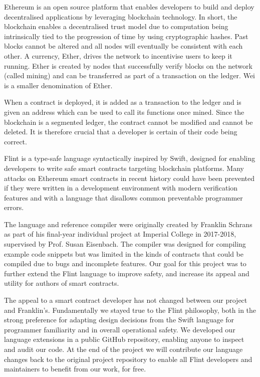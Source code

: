 Ethereum is an open source platform that enables developers to build and deploy decentralised applications by leveraging blockchain technology\cite{bg-ethereum}. In short, the blockchain enables a decentralised trust model due to computation being intrinsically tied to the progression of time by using cryptographic hashes\cite{ptb}. Past blocks cannot be altered and all nodes will eventually be consistent with each other. A currency, Ether, drives the network to incentivise users to keep it running. Ether is created by nodes that successfully verify blocks on the network (called mining) and can be transferred as part of a transaction on the ledger. Wei is a smaller denomination of Ether.

When a contract is deployed, it is added as a transaction to the ledger and is given an address which can be used to call its functions once mined\cite{md-mp}. Since the blockchain is a segmented ledger, the contract cannot be modified and cannot be deleted. It is therefore crucial that a developer is certain of their code being correct\cite{yp}.

Flint is a type-safe language syntactically inspired by Swift, designed for enabling developers to write safe smart contracts targeting blockchain platforms. Many attacks on Ethereum smart contracts in recent history could have been prevented if they were written in a development environment with modern verification features and with a language that disallows common preventable programmer errors.

The language and reference compiler were originally created by Franklin Schrans as part of his final-year individual project at Imperial College in 2017-2018, supervised by Prof. Susan Eisenbach\cite{flint}. The compiler was designed for compiling example code snippets but was limited in the kinds of contracts that could be compiled due to bugs and incomplete features. Our goal for this project was to further extend the Flint language to improve safety, and increase its appeal and utility for authors of smart contracts.

The appeal to a smart contract developer has not changed between our project and Franklin's. Fundamentally we stayed true to the Flint philosophy, both in the strong preference for adapting design decisions from the Swift language for programmer familiarity and in overall operational safety. We developed our language extensions in a public GitHub repository, enabling anyone to inspect and audit our code. At the end of the project we will contribute our language changes back to the original project repository to enable all Flint developers and maintainers to benefit from our work, for free.
